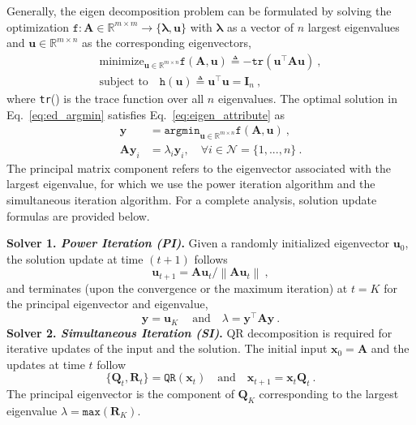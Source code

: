 \documentclass{article}
\newcommand{\mb}[1]{\mathbf{#1}}
\newcommand\norm[1]{\left\lVert#1\right\rVert}
\theoremstyle{plain}
\theoremstyle{definition}
\theoremstyle{remark}
\begin{document}
Generally, the eigen decomposition problem can be formulated by solving the optimization $\texttt{f}: \mb{A} \in \mathbb{R}^{m \times m} \rightarrow \{ \boldsymbol{\lambda}, \mb{u} \}$ with $\boldsymbol{\lambda}$ as a vector of $n$ largest eigenvalues and $\mb{u} \in \mathbb{R}^{m \times n}$ as the corresponding eigenvectors,
%
\begin{equation}
\begin{gathered}
\label{eq:ed}
\text{minimize}_{\mb{u} \in \mathbb{R}^{m \times n}} \texttt{f}(\mb{A}, \mb{u}) \triangleq -\texttt{tr} \left( \mb{u}^\top \mb{A} \mb{u} \right)\ ,\\
\text{subject to} \quad \texttt{h} \left( \mb{u} \right) \triangleq \mb{u}^\top \mb{u} = \mb{I}_n\ ,
\end{gathered}
\end{equation}
%
where \texttt{tr}() is the trace function over all $n$ eigenvalues.
The optimal solution in Eq.~\eqref{eq:ed_argmin} satisfies Eq.~\eqref{eq:eigen_attribute} as
%
\begin{align}
\mb{y} &= \texttt{argmin}_{\mb{u} \in \mathbb{R}^{m \times n}} \texttt{f}(\mb{A}, \mb{u})\label{eq:ed_argmin}\ ,\\
\mb{A} \mb{y}_i &= \lambda_i \mb{y}_i, \quad \forall i \in \mathcal{N} = \{1, ..., n\} \label{eq:eigen_attribute}\ .
\end{align}
%
The principal matrix component refers to the eigenvector associated with the largest
eigenvalue, for which we use the power iteration algorithm and the simultaneous iteration algorithm.
For a complete analysis, solution update formulas are provided below.

\textbf{Solver 1. \textit{Power Iteration (PI)}.}
Given a randomly initialized eigenvector $\mb{u}_0$, the solution update at
time $(t+1)$ follows
%
\begin{equation}
\label{eq:pi_update}
    \mb{u}_{t+1} = \mb{A} \mb{u}_t / \norm{ \mb{A} \mb{u}_t }\ ,
\end{equation}
and terminates (upon the convergence or the maximum iteration) at $t=K$ for the principal eigenvector and eigenvalue,
%
\begin{equation}
\label{eq:pi_optimal}
    \mb{y} = \mb{u}_K\ \quad \text{and} \quad
    \lambda = \mb{y}^\top \mb{A} \mb{y}\ .
\end{equation}
%
\textbf{Solver 2. \textit{Simultaneous Iteration (SI)}.}
QR decomposition is required for iterative updates of the input and the solution.
The initial input $\mb{x}_0=\mb{A}$ and the updates at time $t$ follow
%
\begin{equation}
\label{eq:si_update}
    \{\mb{Q}_t, \mb{R}_t\} = \texttt{QR}(\mb{x}_t) \quad \text{and} \quad
    \mb{x}_{t+1} = \mb{x}_t \mb{Q}_t\ .
\end{equation}
The principal eigenvector is the component of $\mb{Q}_K$ corresponding to the largest eigenvalue $\lambda=\texttt{max} (\mb{R}_K)$.
\end{document}
